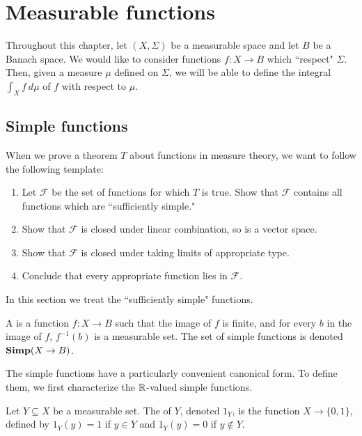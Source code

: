 \chapter{Measurable functions}
Throughout this chapter, let $(X, \Sigma)$ be a measurable space and let $B$ be a Banach space.
We would like to consider functions $f: X \to B$ which ``respect" $\Sigma$. Then, given a measure $\mu$ defined on $\Sigma$, we will be able to define the integral $\int_{X} f~d\mu$ of $f$ with respect to $\mu$.

\section{Simple functions}
When we prove a theorem $T$ about functions in measure theory, we want to follow the following template:
\begin{enumerate}
\item Let $\mathcal F$ be the set of functions for which $T$ is true. Show that $\mathcal F$ contains all functions which are ``sufficiently simple."
\item Show that $\mathcal F$ is closed under linear combination, so is a vector space.
\item Show that $\mathcal F$ is closed under taking limits of appropriate type.
\item Conclude that every appropriate function lies in $\mathcal F$.
\end{enumerate}
In this section we treat the ``sufficiently simple" functions.

\begin{definition}
A  is a function $f: X \to B$ such that the image of $f$ is finite, and for every $b$ in the image of $f$, $f^{-1}(b)$ is a measurable set.
The set of simple functions is denoted $\mathbf{Simp}(X \to B)$.
\end{definition}

\begin{subsec}
The simple functions have a particularly convenient canonical form.
To define them, we first characterize the $\mathbb{R}$-valued simple functions.
\end{subsec}

\begin{definition}
Let $Y \subseteq X$ be a measurable set. The  of $Y$, denoted $1_Y$, is the function $X \to \{0, 1\}$, defined by $1_Y(y) = 1$ if $y \in Y$ and $1_Y(y) = 0$ if $y \notin Y$.
\end{definition}

